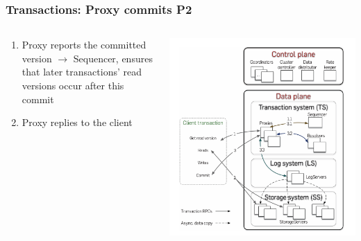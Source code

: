 \begin{frame}
    \frametitle{Transactions: Proxy commits P2}
    \begin{columns}
        \begin{column}{0.5\textwidth}
            \begin{enumerate}
    \item Proxy reports the committed version $\rightarrow$ Sequencer, ensures that later transactions' read versions occur after this commit
    \item Proxy replies to the client
            \end{enumerate}
        \end{column}
        \begin{column}{0.5\textwidth}
            \centering
            \includegraphics[width=\textwidth]{img/2-Architecture/Architecture and transaction processing.png}
        \end{column}
    \end{columns}
\end{frame}




